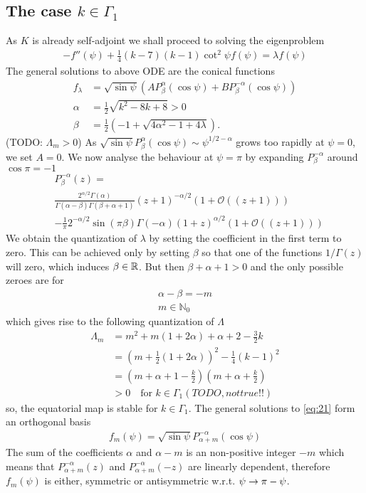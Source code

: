 \subsection{The case $k\in\Gamma_1$}
\label{sec:case-kingamma_1}

As $K$ is already self-adjoint we shall proceed to solving the
eigenproblem
\begin{align}
  \label{eq:21}
  -f''(\psi)+\frac{1}{4}(k-7)(k-1)\cot^2\psi f(\psi)=\lambda f(\psi)
\end{align}
The general solutions to above ODE are the conical functions
\begin{align}
  \label{eq:1}
  f_\lambda&=\sqrt{\sin\psi}
  \left(AP_{\beta}^{\alpha}(\cos\psi)+BP_{\beta}^{-\alpha}(\cos\psi)\right)\\
  \alpha&=\frac{1}{2}\sqrt{k^2-8k+8}>0\\
  \beta&=\frac{1}{2}\left(-1+\sqrt{4\alpha^2-1+4\lambda}\right).
\end{align}
(TODO: $\Lambda_m>0$) As $\sqrt{\sin\psi}P_\beta^{\alpha}(\cos\psi)\sim\psi^{1/2-\alpha}$
grows too rapidly at $\psi=0$, we set $A=0$. We now analyse the
behaviour at $\psi=\pi$ by expanding $P_\beta^{-\alpha}$ around
$\cos\pi=-1$
\begin{align}
  \label{eq:2}
  &P_\beta^{-\alpha}(z)=\\
  &\frac{2^{\alpha/2}\Gamma(\alpha)}{\Gamma(\alpha-\beta)\Gamma(\beta+\alpha+1)}
  (z+1)^{-\alpha/2}(1+\mathcal{O}((z+1)))\\
  &-\frac{1}{\pi}2^{-\alpha/2}\sin(\pi\beta)\Gamma(-\alpha)
  (1+z)^{\alpha/2}(1+\mathcal{O}((z+1)))
\end{align}
We obtain the quantization of $\lambda$ by setting the coefficient in
the first term to zero. This can be achieved only by setting $\beta$
so that one of the functions $1/\Gamma(z)$ will zero, which induces
$\beta\in\mathbb{R}$. But then $\beta+\alpha+1>0$ and the only possible zeroes
are for
\begin{align}
  \label{eq:3}
  \alpha-\beta=-m\\
  m\in\mathbb{N}_0
\end{align}
which gives rise to the following quantization of $\Lambda$
\begin{align}
  \label{eq:6}
  \Lambda_m&=m^2+m(1+2\alpha)+\alpha+2-\frac{3}{2}k\\
  &=(m+\frac{1}{2}(1+2\alpha))^2-\frac{1}{4}(k-1)^2\\
  &=(m+\alpha+1-\frac{k}{2})(m+\alpha+\frac{k}{2})\\
  &>0\quad\text{for } k\in\Gamma_1 (TODO, not true!!)
\end{align}
so, the equatorial map is stable for $k\in\Gamma_1$.  The general
solutions to \eqref{eq:21} form an orthogonal basis
\begin{align}
  \label{eq:11}
  f_m(\psi)=\sqrt{\sin\psi}P_{\alpha+m}^{-\alpha}(\cos\psi)
\end{align}
The sum of the coefficients $\alpha$ and $\alpha-m$ is an non-positive
integer $-m$ which means that $P_{\alpha+m}^{-\alpha}(z)$ and
$P_{\alpha+m}^{-\alpha}(-z)$ are linearly dependent, therefore
$f_m(\psi)$ is either, symmetric or antisymmetric
w.r.t. $\psi\rightarrow\pi-\psi$.


